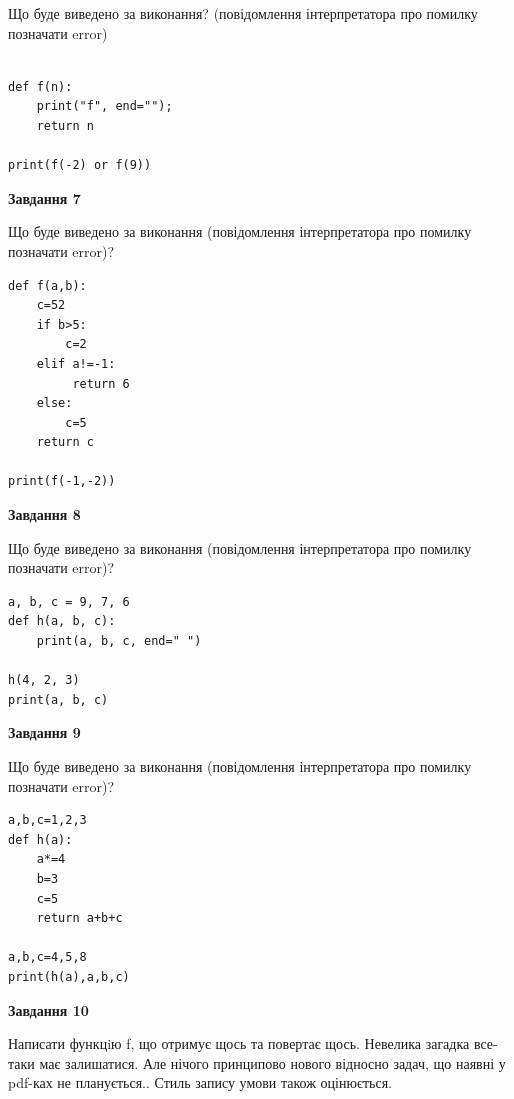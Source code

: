 \documentclass[12pt, ukrainian]{article}
\begin{document}
{\begin {large}
Що буде виведено за виконання? (повідомлення інтерпретатора про помилку позначати error)\par
\begin{verbatim}

def f(n):
    print("f", end="");
    return n

print(f(-2) or f(9))
\end{verbatim}

{\begin {center}\textbf{Завдання 7}\end {center}}

Що буде виведено за виконання (повідомлення інтерпретатора про помилку позначати error)?\par
\begin{verbatim}
def f(a,b):
    c=52
    if b>5:
        c=2
    elif a!=-1:
         return 6
    else: 
        c=5
    return c

print(f(-1,-2))
\end{verbatim}

{\begin {center}\textbf{Завдання 8}\end {center}}

Що буде виведено за виконання (повідомлення інтерпретатора про помилку позначати error)?\par
\begin{verbatim}
a, b, c = 9, 7, 6
def h(a, b, c):
    print(a, b, c, end=" ")

h(4, 2, 3)
print(a, b, c)
\end{verbatim}

{\begin {center}\textbf{Завдання 9}\end {center}}

Що буде виведено за виконання (повідомлення інтерпретатора про помилку позначати error)?\par
\begin{verbatim}
a,b,c=1,2,3
def h(a):
    a*=4
    b=3
    c=5
    return a+b+c

a,b,c=4,5,8
print(h(a),a,b,c)
\end{verbatim}

{\begin {center}\textbf{Завдання 10}\end {center}}


Написати функцiю f, що отримує щось та повертає щось. Невелика загадка все-таки має залишатися. Але нічого принципово нового відносно задач, що наявні у pdf-ках не планується.. Стиль запису умови також оцінюється.\par
\end {large}}
\newpage
\end{document}
